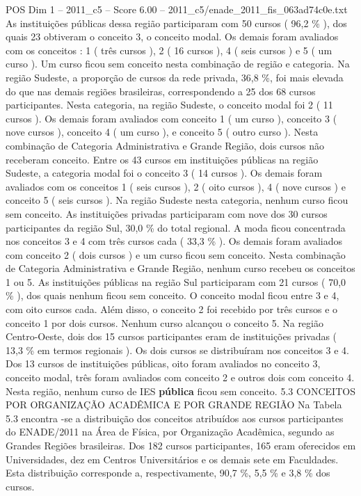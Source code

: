 \begin{textsample}{POS Dim 1 – 2011\_c5 – Score 6.00 – 2011\_c5/enade\_2011\_fis\_063ad74c0e.txt}
As instituições públicas dessa região participaram com 50 cursos ( 96,2 \% ), dos quais 23 obtiveram o conceito 3, o conceito modal.
Os demais foram avaliados com os conceitos : 1 ( três cursos ), 2 ( 16 cursos ), 4 ( seis cursos ) e 5 ( um curso ).
Um curso ficou sem conceito nesta combinação de região e categoria.
Na região Sudeste, a proporção de cursos da rede privada, 36,8 \%, foi mais elevada do que nas demais regiões brasileiras, correspondendo a 25 dos 68 cursos participantes.
Nesta categoria, na região Sudeste, o conceito modal foi 2 ( 11 cursos ).
Os demais foram avaliados com conceito 1 ( um curso ), conceito 3 ( nove cursos ), conceito 4 ( um curso ), e conceito 5 ( outro curso ).
Nesta combinação de Categoria Administrativa e Grande Região, dois cursos não receberam conceito.
Entre os 43 cursos em instituições públicas na região Sudeste, a categoria modal foi o conceito 3 ( 14 cursos ).
Os demais foram avaliados com os conceitos 1 ( seis cursos ), 2 ( oito cursos ), 4 ( nove cursos ) e conceito 5 ( seis cursos ).
Na região Sudeste nesta categoria, nenhum curso ficou sem conceito.
As instituições privadas participaram com nove dos 30 cursos participantes da região Sul, 30,0 \% do total regional.
A moda ficou concentrada nos conceitos 3 e 4 com três cursos cada ( 33,3 \% ).
Os demais foram avaliados com conceito 2 ( dois cursos ) e um curso ficou sem conceito.
Nesta combinação de Categoria Administrativa e Grande Região, nenhum curso recebeu os conceitos 1 ou 5.
As instituições públicas na região Sul participaram com 21 cursos ( 70,0 \% ), dos quais nenhum ficou sem conceito.
O conceito modal ficou entre 3 e 4, com oito cursos cada.
Além disso, o conceito 2 foi recebido por três cursos e o conceito 1 por dois cursos.
Nenhum curso alcançou o conceito 5.
Na região Centro-Oeste, dois dos 15 cursos participantes eram de instituições privadas ( 13,3 \% em termos regionais ).
Os dois cursos se distribuíram nos conceitos 3 e 4.
Dos 13 cursos de instituições públicas, oito foram avaliados no conceito 3, conceito modal, três foram avaliados com conceito 2 e outros dois com conceito 4.
Nesta região, nenhum curso de IES \textbf{pública} ficou sem conceito. 5.3 CONCEITOS POR ORGANIZAÇÃO ACADÊMICA E POR GRANDE REGIÃO Na Tabela 5.3 encontra -se a distribuição dos conceitos atribuídos aos cursos participantes do ENADE/2011 na Área de Física, por Organização Acadêmica, segundo as Grandes Regiões brasileiras.
Dos 182 cursos participantes, 165 eram oferecidos em Universidades, dez em Centros Universitários e os demais sete em Faculdades.
Esta distribuição corresponde a, respectivamente, 90,7 \%, 5,5 \% e 3,8 \% dos cursos.

\end{textsample}
